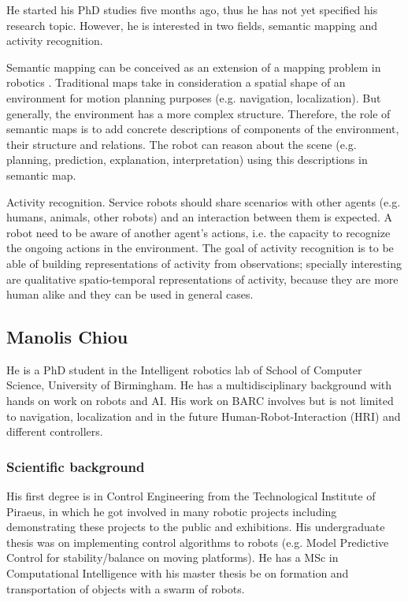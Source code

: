 \documentclass[conference]{IEEEtran}
\begin{document}
He started his PhD studies five months ago, thus he has not yet specified his research topic. However, he is interested in two fields, semantic mapping and activity recognition.

Semantic mapping can be conceived as an extension of a mapping problem in robotics \cite{Nuchter08_TowardsSemanticMaps}. Traditional maps take in consideration a spatial shape of an environment for motion planning purposes (e.g. navigation, localization). But generally, the environment has a more complex structure. Therefore, the role of semantic maps is to add concrete descriptions of components of the environment, their structure and relations. The robot can reason about the scene (e.g. planning, prediction, explanation, interpretation) using this descriptions in semantic map.

Activity recognition. Service robots should share scenarios with other agents (e.g. humans, animals, other robots) and an interaction between them is expected. A robot need to be aware of another agent's actions, i.e. the capacity to recognize the ongoing actions in the environment. The goal of activity recognition is to be able of building representations of activity from observations; specially interesting are qualitative spatio-temporal representations of activity, because they are more human alike and they can be used in general cases.

\subsection{Manolis Chiou}

He is a PhD student in the Intelligent robotics lab of School of Computer Science, University of Birmingham. He has a multidisciplinary background with hands on work on robots and AI. His work on BARC involves but is not limited to navigation, localization and in the future Human-Robot-Interaction (HRI) and different controllers.

\subsubsection*{Scientific background}

His first degree is in Control Engineering from the Technological Institute of Piraeus, in which he got involved in many robotic projects including demonstrating these projects to the public and exhibitions. His undergraduate thesis was on implementing control algorithms to robots (e.g. Model Predictive Control for stability/balance on moving platforms). He has a MSc in Computational Intelligence with his master thesis be on formation and transportation of objects with a swarm of robots.  
\end{document}

